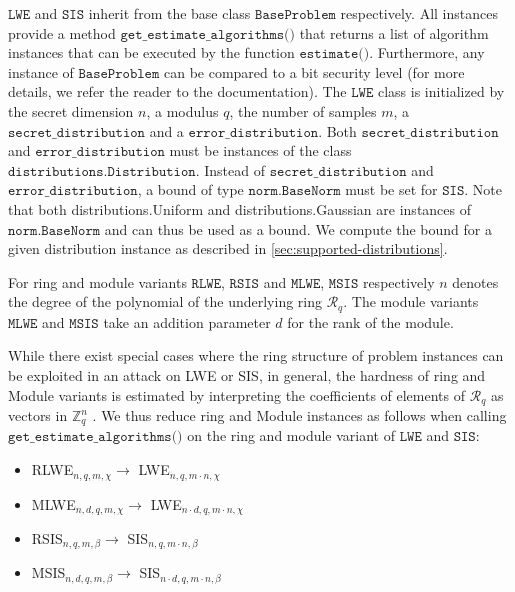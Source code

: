 $\texttt{LWE}$ and $\texttt{SIS}$ inherit from the base class $\texttt{BaseProblem}$ respectively. All instances provide a method $\texttt{get\_estimate\_algorithms()}$ that returns a list of algorithm instances that can be executed by the function $\texttt{estimate()}$. Furthermore, any instance of $\texttt{BaseProblem}$ can be compared to a bit security level (for more details, we refer the reader to the documentation). The $\texttt{LWE}$ class is initialized by the secret dimension $n$, a modulus $q$, the number of samples $m$, a $\texttt{secret\_distribution}$ and a $\texttt{error\_distribution}$. Both $\texttt{secret\_distribution}$ and $\texttt{error\_distribution}$ must be instances of the class $\texttt{distributions.Distribution}$. Instead of $\texttt{secret\_distribution}$ and $\texttt{error\_distribution}$, a bound of type $\texttt{norm.BaseNorm}$ must be set for $\texttt{SIS}$. Note that both {distributions.Uniform} and {distributions.Gaussian} are instances of $\texttt{norm.BaseNorm}$ and can thus be used as a bound. We compute the bound for a given distribution instance as described in \cref{sec:supported-distributions}.

For ring and module variants $\texttt{RLWE}$, $\texttt{RSIS}$ and $\texttt{MLWE}$, $\texttt{MSIS}$ respectively $n$ denotes the degree of the polynomial of the underlying ring $\mathcal{R}_q$. The module variants $\texttt{MLWE}$ and $\texttt{MSIS}$ take an addition parameter $d$ for the rank of the module.

While there exist special cases where the ring structure of problem instances can be exploited in an attack on LWE or SIS, %
in general, the hardness of ring and Module variants is estimated by interpreting the coefficients of elements of $\mathcal{R}_q$ as vectors in $\mathbb{Z}_q^n$ \cite{ACDDPPVW18}.
We thus reduce ring and Module instances as follows when calling $\texttt{get\_estimate\_algorithms()}$ on the ring and module variant of $\texttt{LWE}$ and $\texttt{SIS}$:
\begin{itemize}
    \item RLWE$_{n, q, m, \chi} \longrightarrow$ LWE$_{n, q, m \cdot n, \chi}$
    \item MLWE$_{n, d, q, m, \chi} \longrightarrow$ LWE$_{n \cdot d, q, m \cdot n, \chi}$
    \item RSIS$_{n, q, m, \beta} \longrightarrow$ SIS$_{n, q, m \cdot n, \beta}$
    \item MSIS$_{n, d, q, m, \beta} \longrightarrow$ SIS$_{n \cdot d, q, m \cdot n, \beta}$
\end{itemize}


